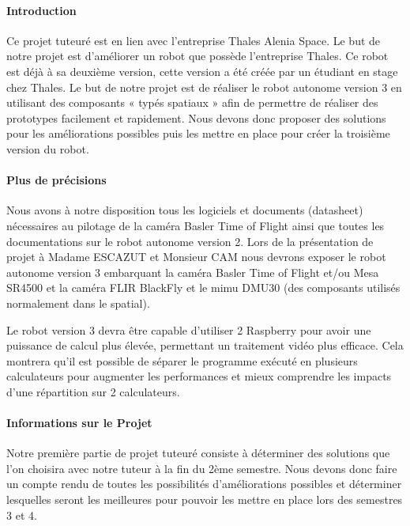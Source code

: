 \documentclass{PackagerQualityN}
\begin{document}
\newp
{} %
\paragraph{Introduction}
Ce projet tuteuré est en lien avec l'entreprise Thales Alenia Space.
Le but de notre projet est d'améliorer un robot que possède l'entreprise Thales.
Ce robot est déjà à sa deuxième version, cette version a été créée par un étudiant en stage chez Thales.
Le but de notre projet est de réaliser le robot autonome version 3 en utilisant des composants « typés spatiaux » afin de permettre de réaliser des prototypes facilement et rapidement.
Nous devons donc proposer des solutions pour les améliorations possibles puis les mettre en place pour créer la troisième version du robot.


\paragraph{Plus de précisions}

Nous avons à notre disposition tous les logiciels et documents (datasheet) nécessaires au pilotage de la caméra Basler Time of Flight ainsi que toutes les documentations sur le robot autonome version 2. Lors de la présentation de projet à Madame ESCAZUT et Monsieur CAM nous devrons exposer le robot autonome version 3 embarquant la caméra Basler Time of Flight et/ou Mesa SR4500 et la caméra FLIR BlackFly et le mimu DMU30 (des composants utilisés normalement dans le spatial).


Le robot version 3 devra être capable d'utiliser 2 Raspberry pour avoir une puissance de calcul plus élevée, permettant un traitement vidéo plus efficace. Cela montrera qu'il est possible de séparer le programme exécuté en plusieurs calculateurs pour augmenter les performances et mieux comprendre les impacts d’une répartition sur 2 calculateurs.



\paragraph{Informations sur le Projet}

Notre première partie de projet tuteuré consiste à déterminer des solutions que l’on choisira avec notre tuteur à la fin du 2ème semestre.
Nous devons donc faire un compte rendu de toutes les possibilités d’améliorations possibles et déterminer lesquelles seront les meilleures pour pouvoir les mettre en place lors des semestres 3 et 4.
\end{document}
